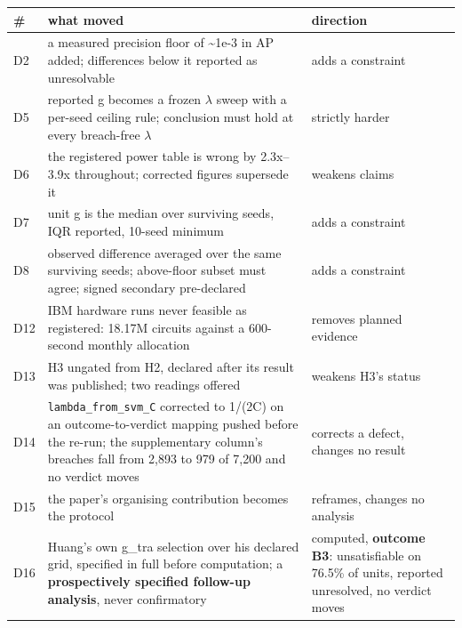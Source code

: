 \documentclass[
  10pt,
]{article}
\newcounter{none} %
\begin{document}
{\def\LTcaptype{none} %
\begin{longtable}[]{@{}
  >{\raggedright\arraybackslash}p{}
  >{\raggedright\arraybackslash}p{}
  >{\raggedright\arraybackslash}p{}@{}}
\toprule\noalign{}
\begin{minipage}[b]{\linewidth}\raggedright
\#
\end{minipage} & \begin{minipage}[b]{\linewidth}\raggedright
what moved
\end{minipage} & \begin{minipage}[b]{\linewidth}\raggedright
direction
\end{minipage} \\
\midrule\noalign{}
\endhead
\bottomrule\noalign{}
\endlastfoot
D2 & a measured precision floor of \textasciitilde1e-3 in AP added;
differences below it reported as unresolvable & adds a constraint \\
D5 & reported g becomes a frozen \(\lambda\) sweep with a per-seed
ceiling rule; conclusion must hold at every breach-free \(\lambda\) &
strictly harder \\
D6 & the registered power table is wrong by 2.3x--3.9x throughout;
corrected figures supersede it & weakens claims \\
D7 & unit g is the median over surviving seeds, IQR reported, 10-seed
minimum & adds a constraint \\
D8 & observed difference averaged over the same surviving seeds;
above-floor subset must agree; signed secondary pre-declared & adds a
constraint \\
D12 & IBM hardware runs never feasible as registered: 18.17M circuits
against a 600-second monthly allocation & removes planned evidence \\
D13 & H3 ungated from H2, declared after its result was published; two
readings offered & weakens H3's status \\
D14 & \texttt{lambda\_\allowbreak{}from\_\allowbreak{}svm\_\allowbreak{}C} corrected to 1/(2C) on an
outcome-to-verdict mapping pushed before the re-run; the supplementary
column's breaches fall from 2,893 to 979 of 7,200 and no verdict moves &
corrects a defect, changes no result \\
D15 & the paper's organising contribution becomes the protocol &
reframes, changes no analysis \\
D16 & Huang's own g\_tra selection over his declared grid, specified in
full before computation; a \textbf{prospectively specified follow-up
analysis}, never confirmatory & computed, \textbf{outcome B3}:
unsatisfiable on 76.5\% of units, reported unresolved, no verdict
moves \\
\end{longtable}
}
\end{document}

